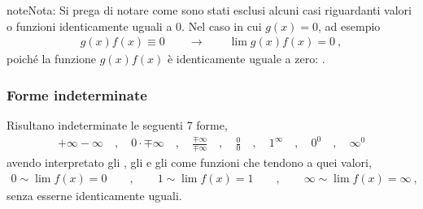\documentclass[letterpaper,10pt,italian]{jupyterBook}
\begin{document}
\begin{sphinxadmonition}{note}{Nota:}
\sphinxAtStartPar
Si prega di notare come sono stati esclusi alcuni casi riguardanti valori o funzioni identicamente uguali a \(0\). Nel caso in cui \(g(x) = 0\), ad esempio
\begin{equation*}
\begin{split}g(x) f(x) \equiv 0 \qquad \rightarrow \qquad \lim g(x) f(x) = 0 \ ,\end{split}
\end{equation*}
\sphinxAtStartPar
poiché la funzione \(g(x) f(x)\) è identicamente uguale a zero: .
\end{sphinxadmonition}


\subsubsection{Forme indeterminate}
\label{\detokenize{ch/infinitesimal_calculus/analysis:forme-indeterminate}}\label{\detokenize{ch/infinitesimal_calculus/analysis:infinitesimal-calculus-limits-thms-infinite-simal-undetermined}}
\sphinxAtStartPar
Risultano indeterminate le seguenti 7 forme,
\begin{equation*}
\begin{split}+\infty-\infty \quad , \quad 0 \cdot \mp \infty \quad , \quad \frac{\mp \infty}{\mp \infty} \quad , \quad \frac{0}{0} \quad , \quad 1^{\infty} \quad , \quad 0^0 \quad , \quad \infty^0\end{split}
\end{equation*}
\sphinxAtStartPar
avendo interpretato gli , gli  e gli  come funzioni che tendono a quei valori,
\begin{equation*}
\begin{split}0 \sim \lim f(x) = 0 \qquad , \qquad  1 \sim \lim f(x) = 1  \qquad , \qquad \infty \sim \lim f(x) = \infty \ ,\end{split}
\end{equation*}
\sphinxAtStartPar
senza esserne identicamente uguali.
\label{None:example-9}
\end{document}
